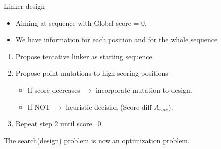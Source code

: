 \documentclass{beamer}
\begin{document}
\begin{frame}{Linker design}
\begin{itemize}
 \item Aiming at sequence with Global score = 0.
 \pause
 \item We have information for each position and for the whole sequence
\pause
\end{itemize}


\begin{enumerate}
 \item Propose tentative linker as starting sequence 
  \pause
 \item Propose point mutations to high scoring positions
      \begin{itemize}
      \item If score decreases $\rightarrow$ incorporate mutation to design.
      \item If NOT $\rightarrow$ heuristic decision (Score diff $A_{rate}$).
     \end{itemize}
 \item Repeat step 2 until score=0
\end{enumerate}

\pause
The search(design) problem is now an optimization problem.


\end{frame}
\end{document}
